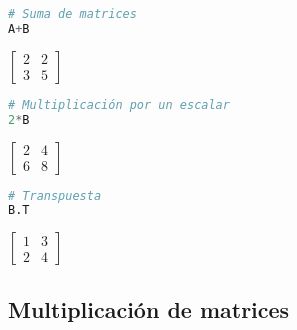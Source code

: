 \documentclass[a4,11pt]{aleph-notas}
\begin{document}
\begin{pycodigo}
    \begin{ipynbcodigo}\begin{lstlisting}[language=Python]
# Suma de matrices
A+B
    \end{lstlisting}\end{ipynbcodigo}
    \begin{ipynbsalida}[2mm]
        $\displaystyle \left[\begin{matrix}2 & 2\\3 & 5\end{matrix}\right]$
    \end{ipynbsalida}
    \begin{ipynbcodigo}\begin{lstlisting}[language=Python]
# Multiplicación por un escalar
2*B
    \end{lstlisting}\end{ipynbcodigo}
    \begin{ipynbsalida}[2mm]
        $\displaystyle \left[\begin{matrix}2 & 4\\6 & 8\end{matrix}\right]$
    \end{ipynbsalida}
    \begin{ipynbcodigo}\begin{lstlisting}[language=Python]
# Transpuesta
B.T
    \end{lstlisting}\end{ipynbcodigo}
    \begin{ipynbsalida}[2mm]
        $\displaystyle \left[\begin{matrix}1 & 3\\2 & 4\end{matrix}\right]$
    \end{ipynbsalida}
\end{pycodigo}

\subsection{Multiplicación de matrices}
\end{document}
